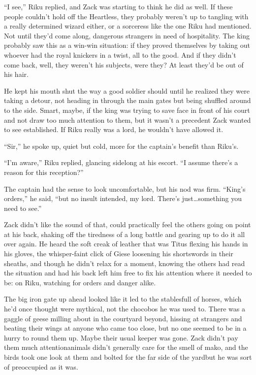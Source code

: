 ``I see,'' Riku replied, and Zack was starting to think he did as well. If these people couldn't hold off the Heartless, they probably weren't up to tangling with a really determined wizard either, or a sorceress like the one Riku had mentioned. Not until they'd come along, dangerous strangers in need of hospitality. The king probably saw this as a win-win situation: if they proved themselves by taking out whoever had the royal knickers in a twist, all to the good. And if they didn't come back, well, they weren't his subjects, were they? At least they'd be out of his hair.

He kept his mouth shut the way a good soldier should until he realized they were taking a detour, not heading in through the main gates but being shuffled around to the side. Smart, maybe, if the king was trying to save face in front of his court and not draw too much attention to them, but it wasn't a precedent Zack wanted to see established. If Riku really was a lord, he wouldn't have allowed it.

``Sir,'' he spoke up, quiet but cold, more for the captain's benefit than Riku's.

``I'm aware,'' Riku replied, glancing sidelong at his escort. ``I assume there's a reason for this reception?''

The captain had the sense to look uncomfortable, but his nod was firm. ``King's orders,'' he said, ``but no insult intended, my lord. There's just\ldots something you need to see.''

Zack didn't like the sound of that, could practically feel the others going on point at his back, shaking off the tiredness of a long battle and gearing up to do it all over again. He heard the soft creak of leather that was Titus flexing his hands in his gloves, the whisper-faint click of Giese loosening his shortswords in their sheaths, and though he didn't relax for a moment, knowing the others had read the situation and had his back left him free to fix his attention where it needed to be: on Riku, watching for orders and danger alike.

The big iron gate up ahead looked like it led to the stables\textemdash full of horses, which he'd once thought were mythical, not the chocobos he was used to. There was a gaggle of geese milling about in the courtyard beyond, hissing at strangers and beating their wings at anyone who came too close, but no one seemed to be in a hurry to round them up. Maybe their usual keeper was gone. Zack didn't pay them much attention\textemdash animals didn't generally care for the smell of mako, and the birds took one look at them and bolted for the far side of the yard\textemdash but he was sort of preoccupied as it was.

